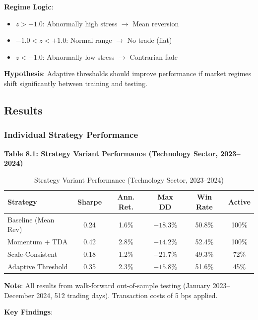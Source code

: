 \textbf{Regime Logic}:
\begin{itemize}
\item $z > +1.0$: Abnormally high stress $\rightarrow$ Mean reversion
\item $-1.0 < z < +1.0$: Normal range $\rightarrow$ No trade (flat)
\item $z < -1.0$: Abnormally low stress $\rightarrow$ Contrarian fade
\end{itemize}

\textbf{Hypothesis}: Adaptive thresholds should improve performance if market regimes shift significantly between training and testing.

\subsection{Results}

\subsubsection{Individual Strategy Performance}

\textbf{Table 8.1: Strategy Variant Performance (Technology Sector, 2023--2024)}

\begin{table}[H]
\centering
\small
\caption{Strategy Variant Performance (Technology Sector, 2023--2024)}
\label{tab:variant-performance}
\begin{tabular}{@{}lccccc@{}}
\toprule
\textbf{Strategy} & \textbf{Sharpe} & \textbf{Ann. Ret.} & \textbf{Max DD} & \textbf{Win Rate} & \textbf{Active} \\
\midrule
Baseline (Mean Rev) & 0.24 & 1.6\% & $-18.3\%$ & 50.8\% & 100\% \\
Momentum + TDA & 0.42 & 2.8\% & $-14.2\%$ & 52.4\% & 100\% \\
Scale-Consistent & 0.18 & 1.2\% & $-21.7\%$ & 49.3\% & 72\% \\
Adaptive Threshold & 0.35 & 2.3\% & $-15.8\%$ & 51.6\% & 45\% \\
\bottomrule
\end{tabular}
\end{table}

\textbf{Note}: All results from walk-forward out-of-sample testing (January 2023--December 2024, 512 trading days). Transaction costs of 5 bps applied.

\textbf{Key Findings}:


